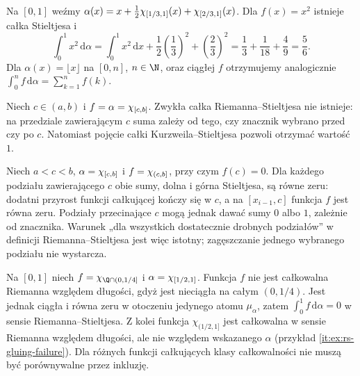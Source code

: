 \begin{przyklad}
Na $[0,1]$ weźmy $\alpha(x)=x+\tfrac12\chi_{[1/3,1]}(x)+\chi_{[2/3,1]}(x)$. Dla $f(x)=x^2$ istnieje całka Stieltjesa i
\[
\int_0^1x^2\,\mathrm d\alpha=\int_0^1x^2\,\mathrm dx+\frac12\left(\frac13\right)^2+\left(\frac23\right)^2=\frac13+\frac1{18}+\frac49=\frac56.
\]
Dla $\alpha(x)=\lfloor x\rfloor$ na $[0,n]$, $n\in\N$, oraz ciągłej $f$ otrzymujemy analogicznie $\int_0^n f\,\mathrm d\alpha=\sum_{k=1}^n f(k)$.
\end{przyklad}
\begin{przyklad}
Niech $c\in(a,b)$ i $f=\alpha=\chi_{[c,b]}$. Zwykła całka Riemanna--Stieltjesa nie istnieje: na przedziale zawierającym $c$ suma zależy od tego, czy znacznik wybrano przed czy po $c$. Natomiast pojęcie całki Kurzweila--Stieltjesa pozwoli otrzymać wartość $1$.
\end{przyklad}
\begin{przyklad}
Niech $a<c<b$, $\alpha=\chi_{[c,b]}$ i $f=\chi_{(c,b]}$, przy czym $f(c)=0$. Dla każdego podziału zawierającego $c$ obie sumy, dolna i górna Stieltjesa, są równe zeru: dodatni przyrost funkcji całkującej kończy się w $c$, a na $[x_{i-1},c]$ funkcja $f$ jest równa zeru. Podziały przecinające $c$ mogą jednak dawać sumy $0$ albo $1$, zależnie od znacznika. Warunek „dla wszystkich dostatecznie drobnych podziałów” w definicji Riemanna--Stieltjesa jest więc istotny; zagęszczanie jednego wybranego podziału nie wystarcza.
\end{przyklad}
\begin{przyklad}
Na $[0,1]$ niech $f=\ind{\Q\cap(0,1/4]}$ i $\alpha=\chi_{[1/2,1]}$. Funkcja $f$ nie jest całkowalna Riemanna względem długości, gdyż jest nieciągła na całym $(0,1/4)$. Jest jednak ciągła i równa zeru w otoczeniu jedynego atomu $\mu_\alpha$, zatem $\int_0^1 f\,\mathrm d\alpha=0$ w sensie Riemanna--Stieltjesa. Z kolei funkcja $\chi_{(1/2,1]}$ jest całkowalna w sensie Riemanna względem długości, ale nie względem wskazanego $\alpha$ (przykład \ref{it:ex:rs-gluing-failure}). Dla różnych funkcji całkujących klasy całkowalności nie muszą być porównywalne przez inkluzję.
\end{przyklad}

